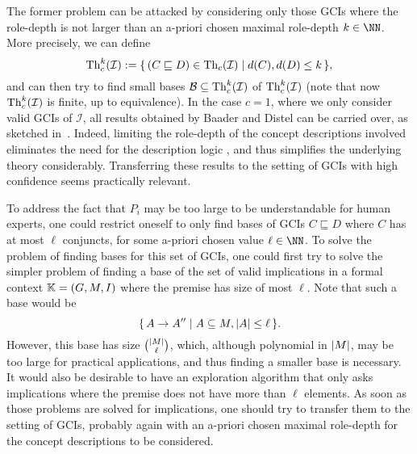 The former problem can be attacked by considering only those GCIs where the role-depth is
not larger than an a-priori chosen maximal role-depth $k \in \NN$.  More precisely, we can
define
\begin{equation*}
  \operatorname{Th}_{c}^{k}(\mathcal{I}) := {\{\, (C \sqsubseteq D) \in \operatorname{Th}_{c}(\mathcal{I}) \mid d(C), d(D)
    \leq k \,\}},
\end{equation*}
and can then try to find small bases $\mathcal{B} \subseteq \operatorname{Th}_{c}^{k}(\mathcal{I})$ of
$\operatorname{Th}_{c}^{k}(\mathcal{I})$ (note that now $\operatorname{Th}_{c}^{k}(\mathcal{I})$ is finite, up to
equivalence).  In the case $c = 1$, where we only consider valid GCIs of $\mathcal{I}$,
all results obtained by Baader and Distel can be carried over, as sketched
in~\cite{FCA-and-Logics}.  Indeed, limiting the role-depth of the concept descriptions
involved eliminates the need for the description logic \ELgfpbot, and thus simplifies the
underlying theory considerably.  Transferring these results to the setting of GCIs with
high confidence seems practically relevant.

To address the fact that $P_{i}$ may be too large to be understandable for human experts,
one could restrict oneself to only find bases of GCIs $C \sqsubseteq D$ where $C$ has at
most $\ell$ conjuncts, for some a-priori chosen value $\ell \in \NN$.  To solve the
problem of finding bases for this set of GCIs, one could first try to solve the simpler
problem of finding a base of the set of valid implications in a formal context ${\mathbb{K}} =
(G, M, I)$ where the premise has size of most $\ell$.  Note that such a base would be
\begin{equation*}
  {\ensuremath{\{\, A \to A'' \mid A \subseteq M, \lvert A\rvert \leq \ell \,\}}}.
\end{equation*}
However, this base has size $\binom{\lvert M\rvert}{\ell}$, which, although polynomial in $\lvert M\rvert$, may be too large for practical applications, and thus finding a smaller base is
necessary.  It would also be desirable to have an exploration algorithm that only asks
implications where the premise does not have more than $\ell$ elements.  As soon as those
problems are solved for implications, one should try to transfer them to the setting of
GCIs, probably again with an a-priori chosen maximal role-depth for the concept
descriptions to be considered.


